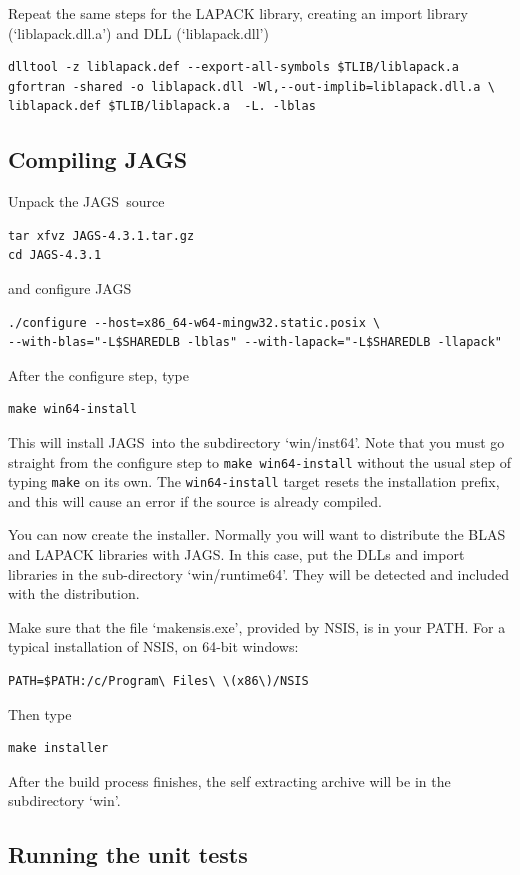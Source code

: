 \documentclass[11pt, a4paper, titlepage]{article}
\newcommand{\JAGS}{\textsf{JAGS}}
\newcommand{\file}[1]{{`\normalfont\textsf{#1}'}}
\begin{document}
Repeat the same steps for the LAPACK library, creating an import library
(\file{liblapack.dll.a}) and DLL (\file{liblapack.dll})
\begin{verbatim}
dlltool -z liblapack.def --export-all-symbols $TLIB/liblapack.a
gfortran -shared -o liblapack.dll -Wl,--out-implib=liblapack.dll.a \
liblapack.def $TLIB/liblapack.a  -L. -lblas
\end{verbatim}

\subsection{Compiling \JAGS}

Unpack the \JAGS\ source
\begin{verbatim}
tar xfvz JAGS-4.3.1.tar.gz
cd JAGS-4.3.1
\end{verbatim}
and configure \JAGS 
\begin{verbatim}
./configure --host=x86_64-w64-mingw32.static.posix \
--with-blas="-L$SHAREDLB -lblas" --with-lapack="-L$SHAREDLB -llapack"
\end{verbatim}

After the configure step, type
\begin{verbatim}
make win64-install
\end{verbatim}
This will install \JAGS\ into the subdirectory \file{win/inst64}.  Note
that you must go straight from the configure step to \texttt{make
  win64-install} without the usual step of typing \texttt{make} on its
own.  The \texttt{win64-install} target resets the installation
prefix, and this will cause an error if the source is already
compiled.

You can now create the installer.  Normally you will want to
distribute the BLAS and LAPACK libraries with \JAGS.  In this case, put
the DLLs and import libraries in the sub-directory
\file{win/runtime64}. They will be detected and included with the
distribution.

Make sure that the file \file{makensis.exe}, provided by
NSIS, is in your PATH. For a typical installation of NSIS, on 64-bit
windows:
\begin{verbatim}
PATH=$PATH:/c/Program\ Files\ \(x86\)/NSIS
\end{verbatim}
Then type
\begin{verbatim}
make installer
\end{verbatim}
After the build process finishes, the self extracting archive will be
in the subdirectory \file{win}.

\subsection{Running the unit tests}
\end{document}
